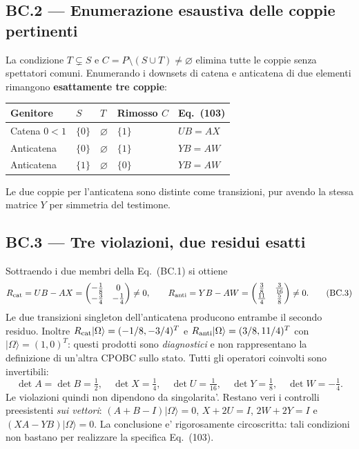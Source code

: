 \documentclass[11pt,a4paper]{article}
\begin{document}
\subsection*{BC.2 --- Enumerazione esaustiva delle coppie pertinenti}
La condizione $T\subsetneq S$ e $C=P\setminus(S\cup T)\ne\varnothing$ elimina tutte le coppie senza spettatori comuni. Enumerando i downsets di catena e anticatena di due elementi rimangono \textbf{esattamente tre coppie}:
\begin{center}\small
\renewcommand{\arraystretch}{1.13}
\begin{tabular}{p{2.75cm}p{2.1cm}p{2.25cm}p{1.9cm}p{3.05cm}}
\toprule
Genitore & $S$ & $T$ & Rimosso $C$ & Eq.~(103) \\ \midrule
Catena $0<1$ & $\{0\}$ & $\varnothing$ & $\{1\}$ & $UB=AX$ \\
Anticatena & $\{0\}$ & $\varnothing$ & $\{1\}$ & $YB=AW$ \\
Anticatena & $\{1\}$ & $\varnothing$ & $\{0\}$ & $YB=AW$ \\ \bottomrule
\end{tabular}
\end{center}
Le due coppie per l'anticatena sono distinte come transizioni, pur avendo la stessa matrice $Y$ per simmetria del testimone.

\clearpage
\subsection*{BC.3 --- Tre violazioni, due residui esatti}
Sottraendo i due membri della Eq.~(BC.1) si ottiene
\begin{equation}
R_{\rm cat}=UB-AX=
\begin{pmatrix}-\frac18&0\\-\frac34&-\frac14\end{pmatrix}\ne0,
\qquad
R_{\rm anti}=YB-AW=
\begin{pmatrix}\frac38&\frac3{16}\\\frac{11}4&\frac58\end{pmatrix}\ne0.
\tag{BC.3}
\end{equation}
Le due transizioni singleton dell'anticatena producono entrambe il secondo residuo. Inoltre $R_{\rm cat}|\Omega\rangle=(-1/8,-3/4)^T$ e $R_{\rm anti}|\Omega\rangle=(3/8,11/4)^T$ con $|\Omega\rangle=(1,0)^T$: questi prodotti sono \emph{diagnostici} e non rappresentano la definizione di un'altra CPOBC sullo stato. Tutti gli operatori coinvolti sono invertibili:
\begin{equation}
\det A=\det B=\tfrac12,\quad \det X=\tfrac14,\quad
\det U=\tfrac1{16},\quad\det Y=\tfrac18,\quad\det W=-\tfrac14.
\tag{BC.4}
\end{equation}
Le violazioni quindi non dipendono da singolarita'. Restano veri i controlli preesistenti \emph{sui vettori}: $(A+B-I)|\Omega\rangle=0$, $X+2U=I$, $2W+2Y=I$ e $(XA-YB)|\Omega\rangle=0$. La conclusione e' rigorosamente circoscritta: tali condizioni non bastano per realizzare la specifica Eq.~(103).
\end{document}
